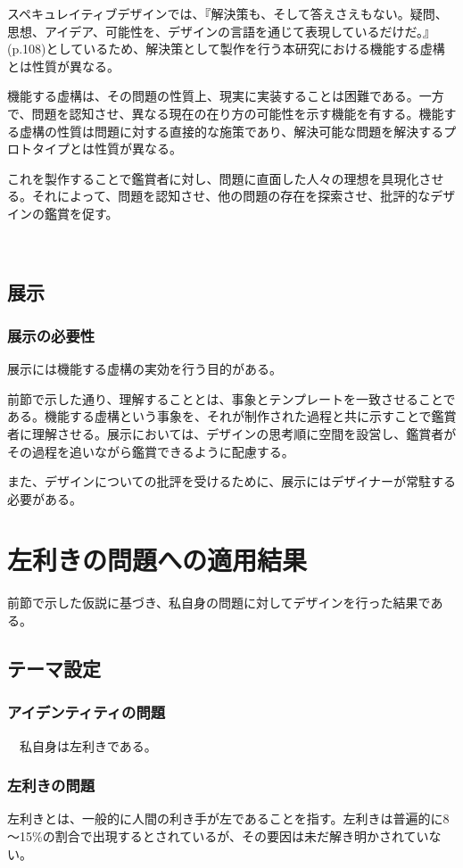 \documentclass{jsarticle}
\begin{document}
スペキュレイティブデザインでは、『解決策も、そして答えさえもない。疑問、思想、アイデア、可能性を、デザインの言語を通じて表現しているだけだ。』(p.108)としているため、解決策として製作を行う本研究における機能する虚構とは性質が異なる。

機能する虚構は、その問題の性質上、現実に実装することは困難である。一方で、問題を認知させ、異なる現在の在り方の可能性を示す機能を有する。機能する虚構の性質は問題に対する直接的な施策であり、解決可能な問題を解決するプロトタイプとは性質が異なる。

これを製作することで鑑賞者に対し、問題に直面した人々の理想を具現化させる。それによって、問題を認知させ、他の問題の存在を探索させ、批評的なデザインの鑑賞を促す。

　\newpage
\subsection{展示}
\subsubsection{展示の必要性}
展示には機能する虚構の実効を行う目的がある。

前節で示した通り、理解することとは、事象とテンプレートを一致させることである。機能する虚構という事象を、それが制作された過程と共に示すことで鑑賞者に理解させる。展示においては、デザインの思考順に空間を設営し、鑑賞者がその過程を追いながら鑑賞できるように配慮する。

また、デザインについての批評を受けるために、展示にはデザイナーが常駐する必要がある。



\newpage
\section{左利きの問題への適用結果}

前節で示した仮説に基づき、私自身の問題に対してデザインを行った結果である。

\subsection{テーマ設定}
\subsubsection{アイデンティティの問題}

　私自身は左利きである。

\subsubsection{左利きの問題}
  左利きとは、一般的に人間の利き手が左であることを指す。左利きは普遍的に8～15\%の割合で出現する\cite{Hardyck}とされているが、その要因は未だ解き明かされていない。
\end{document}
